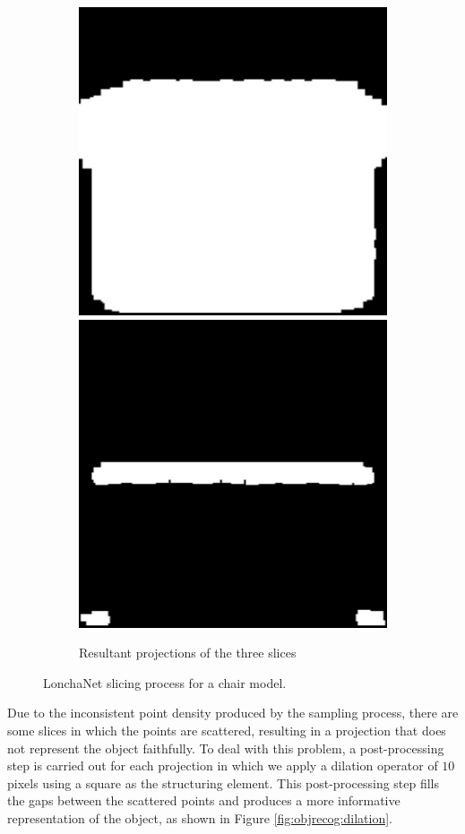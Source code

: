 \begin{figure}[!t]
\begin{subfigure}[t]{0.8\linewidth}
        \includegraphics[height=0.32\linewidth]{Figures/ObjRecog/slices/chair_slice32}
        \includegraphics[height=0.32\linewidth]{Figures/ObjRecog/slices/chair_slice33}
        \caption{Resultant projections of the three slices}
        \label{fig:slicing_c}
	\end{subfigure}
    \caption{LonchaNet slicing process for a chair model.}
    \label{fig:objrecog:slicing}
\end{figure}

Due to the inconsistent point density produced by the sampling process, there are some slices in which the points are scattered, resulting in a projection that does not represent the object faithfully. To deal with this problem, a post-processing step is carried out for each projection in which we apply a dilation operator of $10$ pixels using a square as the structuring element. This post-processing step fills the gaps between the scattered points and produces a more informative representation of the object, as shown in Figure \ref{fig:objrecog:dilation}.

